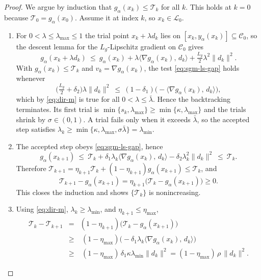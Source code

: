 \documentclass[10pt,a4paper]{amsart}
\newcommand{\inner}[2]{\langle #1,\, #2\rangle}
\newcommand{\norm}[1]{\lVert #1 \rVert}
\begin{document}
\begin{proof}
We argue by induction that $g_\alpha(x_k)\le\mathcal T_k$ for all $k$. This holds at $k=0$ because
$\mathcal T_0=g_\alpha(x_0)$. Assume it at index $k$, so $x_k\in\mathcal L_0$.
\begin{enumerate}[label=(\roman*),leftmargin=2em]
  \item For $0<\lambda\le\lambda_{\max}\le1$ the trial point $x_k+\lambda d_k$ lies on
  $[x_k,y_\alpha(x_k)]\subseteq\mathcal C_0$, so the descent lemma for the $L_g$-Lipschitz gradient on
  $\mathcal C_0$ gives
  \[
    g_\alpha(x_k+\lambda d_k)\ \le\ g_\alpha(x_k)+\lambda\inner{\nabla g_\alpha(x_k)}{d_k}
    +\tfrac{L_g}{2}\lambda^2\norm{d_k}^2 .
  \]
  With $g_\alpha(x_k)\le\mathcal T_k$ and $v_k=\nabla g_\alpha(x_k)$, the test \eqref{eq:sgm-ls-gap} holds
  whenever
  \[
    \big(\tfrac{L_g}{2}+\delta_2\big)\lambda\norm{d_k}^2\ \le\ (1-\delta_1)\big(-\inner{\nabla g_\alpha(x_k)}{d_k}\big) ,
  \]
  which by \eqref{eq:dir-m} is true for all $0<\lambda\le\bar\lambda$. Hence the backtracking terminates.
  Its first trial is $\min\{s_k,\lambda_{\max}\}\ge\min\{\kappa,\lambda_{\max}\}$ and the trials shrink by
  $\sigma\in(0,1)$. A trial fails only when it exceeds $\bar\lambda$, so the accepted step satisfies
  $\lambda_k\ge\min\{\kappa,\lambda_{\max},\sigma\bar\lambda\}=\lambda_{\min}$.

  \item The accepted step obeys \eqref{eq:sgm-ls-gap}, hence
  \[
    g_\alpha(x_{k+1})\ \le\ \mathcal T_k+\delta_1\lambda_k\inner{\nabla g_\alpha(x_k)}{d_k}
    -\delta_2\lambda_k^2\norm{d_k}^2\ \le\ \mathcal T_k .
  \]
  Therefore $\mathcal T_{k+1}=\eta_{k+1}\mathcal T_k+(1-\eta_{k+1})g_\alpha(x_{k+1})\le\mathcal T_k$, and
  \[
  \mathcal T_{k+1}-g_\alpha(x_{k+1})=\eta_{k+1}\big(\mathcal T_k-g_\alpha(x_{k+1})\big)\ge0.
  \]
  This closes the
  induction and shows $\{\mathcal T_k\}$ is nonincreasing.

  \item Using \eqref{eq:dir-m}, $\lambda_k\ge\lambda_{\min}$, and $\eta_{k+1}\le\eta_{\max}$,
  \[
  \begin{array}{lcl}
    \mathcal T_k-\mathcal T_{k+1}&=&(1-\eta_{k+1})\big(\mathcal T_k-g_\alpha(x_{k+1})\big) \\
    \ &\ge& \ (1-\eta_{\max})\big(-\delta_1\lambda_k\inner{\nabla g_\alpha(x_k)}{d_k}\big) \\
    \ &\ge&\ (1-\eta_{\max})\,\delta_1\kappa\lambda_{\min}\norm{d_k}^2=(1-\eta_{\max})\,\rho\,\norm{d_k}^2 .
  \end{array}
  \]
\end{enumerate}
\end{proof}
\end{document}
